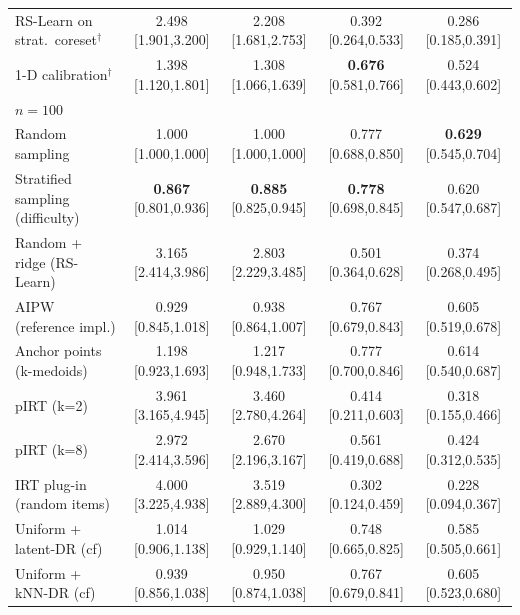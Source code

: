 \begin{tabular}{l cccc}
RS-Learn on strat.\ coreset$^\dagger$ & 2.498 {\scriptsize[1.901,3.200]} & 2.208 {\scriptsize[1.681,2.753]} & 0.392 {\scriptsize[0.264,0.533]} & 0.286 {\scriptsize[0.185,0.391]} \\
1-D calibration$^\dagger$ & 1.398 {\scriptsize[1.120,1.801]} & 1.308 {\scriptsize[1.066,1.639]} & \textbf{0.676} {\scriptsize[0.581,0.766]} & 0.524 {\scriptsize[0.443,0.602]} \\
\midrule
\multicolumn{5}{l}{\emph{$n=100$}}\\
Random sampling & 1.000 {\scriptsize[1.000,1.000]} & 1.000 {\scriptsize[1.000,1.000]} & 0.777 {\scriptsize[0.688,0.850]} & \textbf{0.629} {\scriptsize[0.545,0.704]} \\
Stratified sampling (difficulty) & \textbf{0.867} {\scriptsize[0.801,0.936]} & \textbf{0.885} {\scriptsize[0.825,0.945]} & \textbf{0.778} {\scriptsize[0.698,0.845]} & 0.620 {\scriptsize[0.547,0.687]} \\
Random + ridge (RS-Learn) & 3.165 {\scriptsize[2.414,3.986]} & 2.803 {\scriptsize[2.229,3.485]} & 0.501 {\scriptsize[0.364,0.628]} & 0.374 {\scriptsize[0.268,0.495]} \\
AIPW (reference impl.) & 0.929 {\scriptsize[0.845,1.018]} & 0.938 {\scriptsize[0.864,1.007]} & 0.767 {\scriptsize[0.679,0.843]} & 0.605 {\scriptsize[0.519,0.678]} \\
Anchor points (k-medoids) & 1.198 {\scriptsize[0.923,1.693]} & 1.217 {\scriptsize[0.948,1.733]} & 0.777 {\scriptsize[0.700,0.846]} & 0.614 {\scriptsize[0.540,0.687]} \\
pIRT (k=2) & 3.961 {\scriptsize[3.165,4.945]} & 3.460 {\scriptsize[2.780,4.264]} & 0.414 {\scriptsize[0.211,0.603]} & 0.318 {\scriptsize[0.155,0.466]} \\
pIRT (k=8) & 2.972 {\scriptsize[2.414,3.596]} & 2.670 {\scriptsize[2.196,3.167]} & 0.561 {\scriptsize[0.419,0.688]} & 0.424 {\scriptsize[0.312,0.535]} \\
IRT plug-in (random items) & 4.000 {\scriptsize[3.225,4.938]} & 3.519 {\scriptsize[2.889,4.300]} & 0.302 {\scriptsize[0.124,0.459]} & 0.228 {\scriptsize[0.094,0.367]} \\
Uniform + latent-DR (cf) & 1.014 {\scriptsize[0.906,1.138]} & 1.029 {\scriptsize[0.929,1.140]} & 0.748 {\scriptsize[0.665,0.825]} & 0.585 {\scriptsize[0.505,0.661]} \\
Uniform + kNN-DR (cf) & 0.939 {\scriptsize[0.856,1.038]} & 0.950 {\scriptsize[0.874,1.038]} & 0.767 {\scriptsize[0.679,0.841]} & 0.605 {\scriptsize[0.523,0.680]} \\

\end{tabular}

